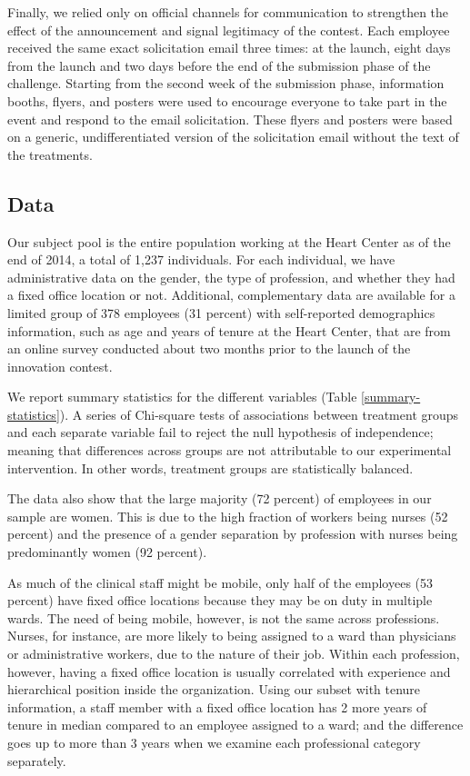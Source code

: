 \documentclass[11pt, titlepage]{article}
\begin{document}
Finally, we relied only on official channels for communication to
strengthen the effect of the announcement and signal legitimacy of the
contest. Each employee received the same exact solicitation email three
times: at the launch, eight days from the launch and two days before the
end of the submission phase of the challenge. Starting from the second
week of the submission phase, information booths, flyers, and posters
were used to encourage everyone to take part in the event and respond to
the email solicitation. These flyers and posters were based on a
generic, undifferentiated version of the solicitation email without the
text of the treatments.

\subsection{Data}\label{data}

Our subject pool is the entire population working at the Heart Center as
of the end of 2014, a total of 1,237 individuals. For each individual,
we have administrative data on the gender, the type of profession, and
whether they had a fixed office location or not. Additional,
complementary data are available for a limited group of 378 employees
(31 percent) with self-reported demographics information, such as age
and years of tenure at the Heart Center, that are from an online survey
conducted about two months prior to the launch of the innovation
contest.



We report summary statistics for the different variables (Table
\ref{summary-statistics}). A series of Chi-square tests of associations
between treatment groups and each separate variable fail to reject the
null hypothesis of independence; meaning that differences across groups
are not attributable to our experimental intervention. In other words,
treatment groups are statistically balanced.

The data also show that the large majority (72 percent) of employees in
our sample are women. This is due to the high fraction of workers being
nurses (52 percent) and the presence of a gender separation by
profession with nurses being predominantly women (92 percent).

As much of the clinical staff might be mobile, only half of the
employees (53 percent) have fixed office locations because they may be
on duty in multiple wards. The need of being mobile, however, is not the
same across professions. Nurses, for instance, are more likely to being
assigned to a ward than physicians or administrative workers, due to the
nature of their job. Within each profession, however, having a fixed
office location is usually correlated with experience and hierarchical
position inside the organization. Using our subset with tenure
information, a staff member with a fixed office location has 2 more
years of tenure in median compared to an employee assigned to a ward;
and the difference goes up to more than 3 years when we examine each
professional category separately.
\end{document}

